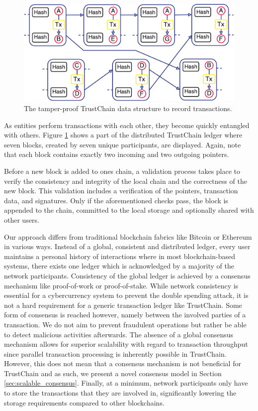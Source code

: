 \documentclass[USenglish]{article}
\begin{document}
\begin{figure}[h!]
	\centering
	\includegraphics[width=0.9\columnwidth]{assets/trustchain}
	\caption{The tamper-proof TrustChain data structure to record transactions.}
	\label{fig:trustchain}
\end{figure}

As entities perform transactions with each other, they become quickly entangled with others.
Figure \ref{fig:trustchain} shows a part of the distributed TrustChain ledger where seven blocks, created by seven unique participants, are displayed.
Again, note that each block contains exactly two incoming and two outgoing pointers.

Before a new block is added to ones chain, a validation process takes place to verify the consistency and integrity of the local chain and the correctness of the new block.
This validation includes a verification of the pointers, transaction data, and signatures.
Only if the aforementioned checks pass, the block is appended to the chain, committed to the local storage and optionally shared with other users.

Our approach differs from traditional blockchain fabrics like Bitcoin or Ethereum in various ways.
Instead of a global, consistent and distributed ledger, every user maintains a personal history of interactions where in most blockchain-based systems, there exists one ledger which is acknowledged by a majority of the network participants.
Consistency of the global ledger is achieved by a consensus mechanism like proof-of-work or proof-of-stake.
While network consistency is essential for a cybercurrency system to prevent the double spending attack, it is not a hard requirement for a generic transaction ledger like TrustChain.
Some form of consensus is reached however, namely between the involved parties of a transaction.
We do not aim to prevent fraudulent operations but rather be able to detect malicious activities afterwards.
The absence of a global consensus mechanism allows for superior scalability with regard to transaction throughput since parallel transaction processing is inherently possible in TrustChain.
However, this does not mean that a consensus mechanism is not beneficial for TrustChain and as such, we present a novel consensus model in Section \ref{sec:scalable_consensus}.
Finally, at a minimum, network participants only have to store the transactions that they are involved in, significantly lowering the storage requirements compared to other blockchains.
\end{document}
